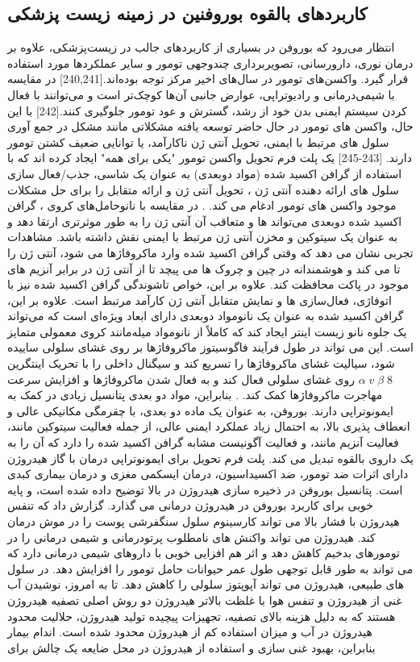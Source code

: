 \subsection{کاربردهای بالقوه بوروفنین در زمینه زیست پزشکی} انتظار می‌رود که بوروفن در بسیاری از کاربردهای جالب در زیست‌پزشکی، علاوه بر درمان نوری، دارورسانی، تصویربرداری چندوجهی تومور و سایر عملکردها مورد استفاده قرار گیرد. واکسن‌های تومور در سال‌های اخیر مرکز توجه بوده‌اند.[240,241] در مقایسه با شیمی‌درمانی و رادیوتراپی، عوارض جانبی آن‌ها کوچک‌تر است و می‌توانند با فعال کردن سیستم ایمنی بدن خود از رشد، گسترش و عود تومور جلوگیری کنند.[242] با این حال، واکسن های تومور در حال حاضر توسعه یافته مشکلاتی مانند مشکل در جمع آوری سلول های مرتبط با ایمنی، تحویل آنتی ژن ناکارآمد، یا توانایی ضعیف کشتن تومور دارند. [243-245]  یک پلت فرم تحویل واکسن تومور "یکی برای همه" ایجاد کرده اند که با استفاده از گرافن اکسید شده (مواد دوبعدی) به عنوان یک شاسی، جذب/فعال سازی سلول های ارائه دهنده آنتی ژن ، تحویل آنتی ژن و ارائه متقابل را برای حل مشکلات موجود واکسن های تومور ادغام می کند. . در مقایسه با نانوحامل‌های کروی ، گرافن اکسید شده دوبعدی می‌تواند ها و متعاقب آن آنتی ژن را به طور موثرتری ارتقا دهد و به عنوان یک سیتوکین و مخزن آنتی ژن مرتبط با ایمنی نقش داشته باشد. مشاهدات تجربی نشان می دهد که وقتی گرافن اکسید شده وارد ماکروفاژها می شود، آنتی ژن را تا می کند و هوشمندانه در چین و چروک ها می پیچد تا از آنتی ژن در برابر آنزیم های موجود در پاکت محافظت کند. علاوه بر این، خواص تاشوندگی گرافن اکسید شده نیز با اتوفاژی، فعال‌سازی ها و نمایش متقابل آنتی ژن کارآمد مرتبط است. علاوه بر این، گرافن اکسید شده به عنوان یک نانومواد دوبعدی دارای ابعاد ویژه‌ای است که می‌تواند یک جلوه نانو زیست اینتر ایجاد کند که کاملاً از نانومواد میله‌مانند کروی معمولی متمایز است. این می تواند در طول فرآیند فاگوسیتوز ماکروفاژها بر روی غشای سلولی ساییده شود، سیالیت غشای ماکروفاژها را تسریع کند و سیگنال داخلی را با تحریک اینتگرین $\alpha\; v\;\beta\;8$ روی غشای سلولی فعال کند و به فعال شدن ماکروفاژها و افزایش سرعت مهاجرت ماکروفاژها کمک کند. . بنابراین، مواد دو بعدی پتانسیل زیادی در کمک به ایمونوتراپی دارند. بوروفن، به عنوان یک ماده دو بعدی، با چقرمگی مکانیکی عالی و انعطاف پذیری بالا، به احتمال زیاد عملکرد ایمنی عالی، از جمله فعالیت سیتوکین مانند، فعالیت آنزیم مانند، و فعالیت آگونیست مشابه گرافن اکسید شده را دارد که آن را به یک داروی بالقوه تبدیل می کند. پلت فرم تحویل برای ایمونوتراپی درمان با گاز هیدروژن دارای اثرات ضد تومور، ضد اکسیداسیون، درمان ایسکمی مغزی و درمان بیماری کبدی است. پتانسیل بوروفن در ذخیره سازی هیدروژن در بالا توضیح داده شده است، و پایه خوبی برای کاربرد بوروفن در هیدروژن درمانی می گذارد. گزارش داد که تنفس هیدروژن با فشار بالا می تواند کارسینوم سلول سنگفرشی پوست را در موش درمان کند. هیدروژن می تواند واکنش های نامطلوب پرتودرمانی و شیمی درمانی را در تومورهای بدخیم کاهش دهد و اثر هم افزایی خوبی با داروهای شیمی درمانی دارد که می تواند به طور قابل توجهی طول عمر حیوانات حامل تومور را افزایش دهد. در سلول های طبیعی، هیدروژن می تواند آپوپتوز سلولی را کاهش دهد. تا به امروز، نوشیدن آب غنی از هیدروژن و تنفس هوا با غلظت بالاتر هیدروژن دو روش اصلی تصفیه هیدروژن هستند که به دلیل هزینه بالای تصفیه، تجهیزات پیچیده تولید هیدروژن، حلالیت محدود هیدروژن در آب و میزان استفاده کم از هیدروژن محدود شده است. اندام بیمار بنابراین، بهبود غنی سازی و استفاده از هیدروژن در محل ضایعه یک چالش برای 